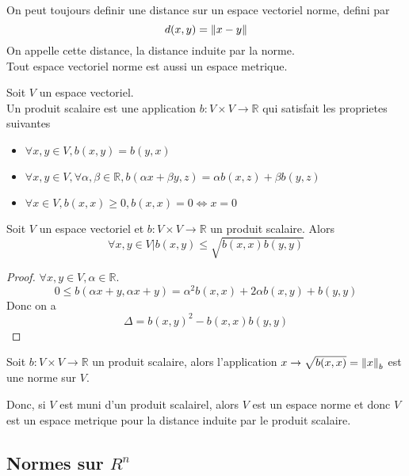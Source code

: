 \documentclass[../main.tex]{subfiles}
\begin{document}
On peut toujours definir une distance sur un espace vectoriel norme, defini par
\[ 
	d( x,y) = \left\lVert x-y\right\rVert
\]
On appelle cette distance, la distance induite par la norme.\\
Tout espace vectoriel norme est aussi un espace metrique.
\begin{defn}
	Soit $V$ un espace vectoriel.\\
	Un produit scalaire est une application $b:V \times V \to \mathbb{R}$ qui satisfait les proprietes suivantes
	\begin{itemize}
		\item $\forall x,y \in V, b( x,y) = b( y,x) $ 
		\item $\forall x,y \in V, \forall \alpha,\beta \in \mathbb{R}, b( \alpha x + \beta y,z) = \alpha b( x,z) + \beta b ( y,z)   $
		\item $\forall x \in V, b( x,x) \geq 0, b( x,x) =0 \iff x=0$
	\end{itemize}
	
	
\end{defn}
\begin{thm}
	Soit $V$ un espace vectoriel et $b:V \times V \to \mathbb{R}$ un produit scalaire. Alors
	\[ 
		\forall x,y \in V |b(x,y )  \leq \sqrt{b( x,x) b( y,y) } 
	\]
	
\end{thm}
\begin{proof}
$\forall x,y \in V, \alpha \in \mathbb{R}$.\\
\[ 
0\leq	b( \alpha x+y, \alpha x + y) = \alpha^{2} b( x,x)  + 2\alpha b( x,y)  + b( y ,y) 
\]
Donc on a
\[ 
	\Delta = b( x,y) ^{2} - b( x,x) b( y,y) 
\]


\end{proof}
\begin{thm}
	Soit $b:V \times V \to \mathbb{R}$ un produit scalaire, alors l'application $x \to \sqrt{b( x,x) } = \left\lVert x\right\rVert_b$ est une norme sur $V$.
\end{thm}
Donc, si $V$ est muni d'un produit scalairel, alors $V$ est un espace norme et donc $V$ est un espace metrique pour la distance induite par le produit scalaire.
\subsection{Normes sur $R^{n}$}
\end{document}
